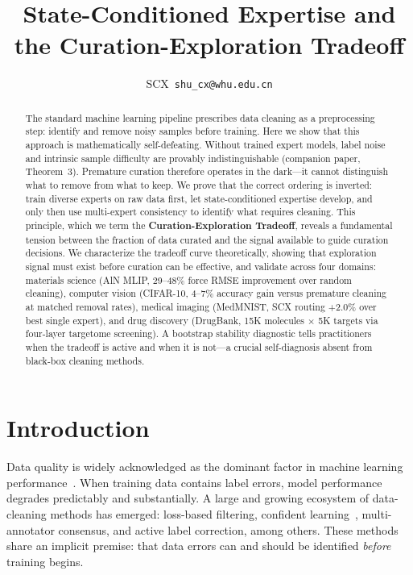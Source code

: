 \documentclass[12pt,a4paper]{article}
\title{State-Conditioned Expertise and the Curation-Exploration Tradeoff}
\author{SCX\ \texttt{shu_cx@whu.edu.cn}}
\begin{document}
\maketitle

\begin{abstract}
The standard machine learning pipeline prescribes data cleaning as a preprocessing step: identify and remove noisy samples before training. Here we show that this approach is mathematically self-defeating. Without trained expert models, label noise and intrinsic sample difficulty are provably indistinguishable (companion paper, Theorem~3). Premature curation therefore operates in the dark---it cannot distinguish what to remove from what to keep. We prove that the correct ordering is inverted: train diverse experts on raw data first, let state-conditioned expertise develop, and only then use multi-expert consistency to identify what requires cleaning. This principle, which we term the \textbf{Curation-Exploration Tradeoff}, reveals a fundamental tension between the fraction of data curated and the signal available to guide curation decisions. We characterize the tradeoff curve theoretically, showing that exploration signal must exist before curation can be effective, and validate across four domains: materials science (AlN MLIP, 29--48\% force RMSE improvement over random cleaning), computer vision (CIFAR-10, 4--7\% accuracy gain versus premature cleaning at matched removal rates), medical imaging (MedMNIST, SCX routing +2.0\% over best single expert), and drug discovery (DrugBank, 15K molecules $\times$ 5K targets via four-layer targetome screening). A bootstrap stability diagnostic tells practitioners when the tradeoff is active and when it is not---a crucial self-diagnosis absent from black-box cleaning methods.
\end{abstract}

\section{Introduction}

Data quality is widely acknowledged as the dominant factor in machine learning performance~\cite{placeholder}. When training data contains label errors, model performance degrades predictably and substantially. A large and growing ecosystem of data-cleaning methods has emerged: loss-based filtering, confident learning~\cite{northcutt2021}, multi-annotator consensus, and active label correction, among others. These methods share an implicit premise: that data errors can and should be identified \emph{before} training begins.
\end{document}
